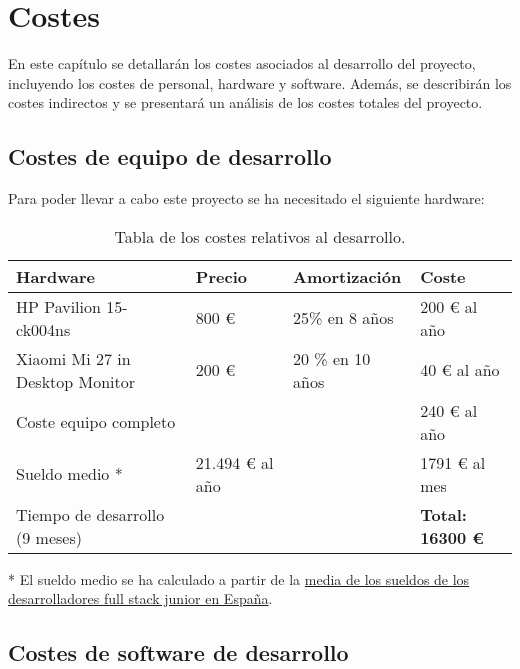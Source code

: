 \chapter{Costes}

En este capítulo se detallarán los costes asociados al desarrollo del proyecto, incluyendo los costes de personal, hardware y software. Además, se describirán los costes indirectos y se presentará un análisis de los costes totales del proyecto.

\section{Costes de equipo de desarrollo}

Para poder llevar a cabo este proyecto se ha necesitado el siguiente hardware:

\begin{table}[H]
  \centering
  \begin{tabular}{|l|l|l|l|}
    \hline
    \textbf{Hardware}               & \textbf{Precio} & \textbf{Amortización} & \textbf{Coste}          \\ \hline
    HP Pavilion 15-ck004ns          & 800 €           & 25\% en 8 años        & 200 € al año            \\ \hline
    Xiaomi Mi 27 in Desktop Monitor & 200 €           & 20 \% en 10 años      & 40 € al año             \\ \hline
    Coste equipo completo           &                 &                       & 240 € al año            \\ \hline
    Sueldo medio *                  & 21.494 € al año &                       & 1791 € al mes           \\ \hline
    Tiempo de desarrollo (9 meses)  &                 &                       & \textbf{Total: 16300 €} \\ \hline
  \end{tabular}
  \caption{Tabla de los costes relativos al desarrollo.}
  \label{table:1}
\end{table}

* El sueldo medio se ha calculado a partir de la \href{https://www.glassdoor.es/Sueldos/desarrollador-full-stack-junior-sueldo-SRCH_KO0,31.htm}{media de los sueldos de los desarrolladores full stack junior en España}.

\section{Costes de software de desarrollo}

